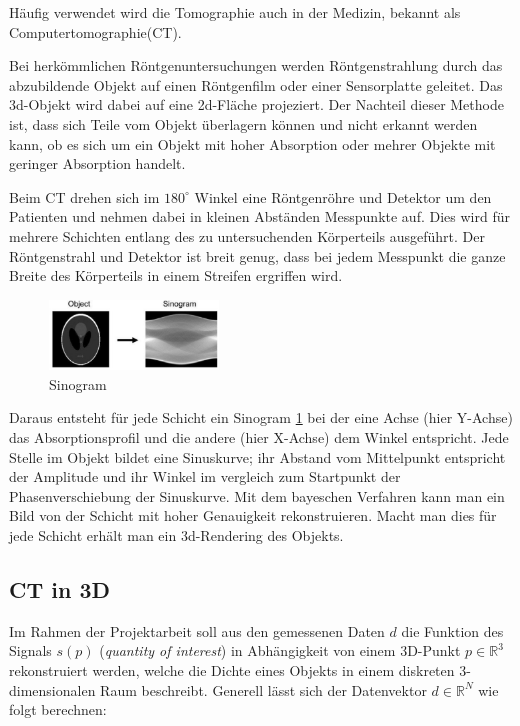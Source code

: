\documentclass[]{dsadokumentation}
\begin{document}
Häufig verwendet wird die Tomographie auch in der Medizin, bekannt als Computertomographie(CT).

Bei herkömmlichen Röntgenuntersuchungen werden Röntgenstrahlung durch das abzubildende Objekt auf einen Röntgenfilm oder einer Sensorplatte geleitet. Das 3d-Objekt wird dabei auf eine 2d-Fläche projeziert. Der Nachteil dieser Methode ist, dass sich Teile vom Objekt überlagern können und nicht erkannt werden kann, ob es sich um ein Objekt mit hoher Absorption oder mehrer Objekte mit geringer Absorption handelt.

Beim CT drehen sich im $180^\circ$ Winkel eine Röntgenröhre und Detektor um den Patienten und nehmen dabei in kleinen Abständen Messpunkte auf. Dies wird für mehrere Schichten entlang des zu untersuchenden Körperteils ausgeführt. Der Röntgenstrahl und Detektor ist breit genug, dass bei jedem Messpunkt die ganze Breite des Körperteils in einem Streifen ergriffen wird.

\begin{figure}
  \includegraphics[width=0.4\textwidth]{k4.2/backprojektion.png}
  \caption{Sinogram}
  \label{k4.2.tomo.ct.bp}
\end{figure}

Daraus entsteht für jede Schicht ein Sinogram \cref{k4.2.tomo.ct.bp} bei der eine Achse (hier Y-Achse) das Absorptionsprofil und die andere (hier X-Achse) dem Winkel entspricht. Jede Stelle im Objekt bildet eine Sinuskurve; ihr Abstand vom Mittelpunkt entspricht der Amplitude und ihr Winkel im vergleich zum Startpunkt der Phasenverschiebung der Sinuskurve. Mit dem bayeschen Verfahren  kann man ein Bild von der Schicht mit hoher Genauigkeit rekonstruieren. Macht man dies für jede Schicht erhält man ein 3d-Rendering des Objekts.

\subsection{CT in 3D}

Im Rahmen der Projektarbeit soll aus den gemessenen Daten $d$ die Funktion des Signals $s(p)$ (\textit{quantity of interest}) in Abhängigkeit von einem 3D-Punkt $p \in \mathbb{R}^3$ rekonstruiert werden, welche die Dichte eines Objekts in einem diskreten 3-dimensionalen Raum beschreibt. Generell lässt sich der Datenvektor $d \in \mathbb{R}^N$ wie folgt berechnen:
\end{document}
